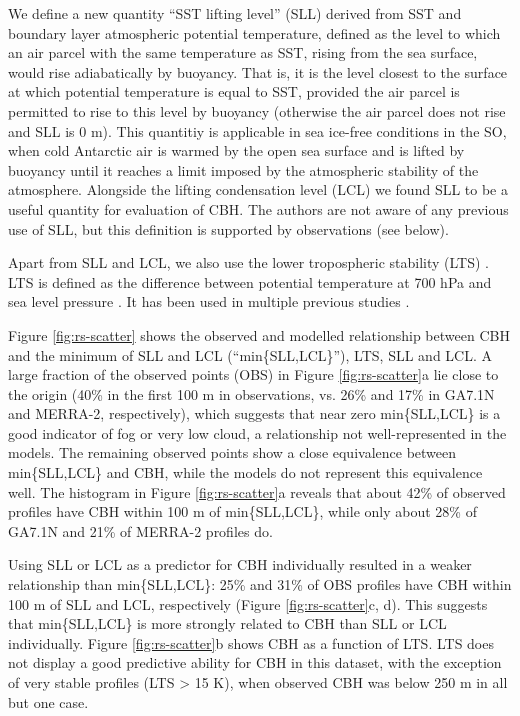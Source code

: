 We define a new quantity ``SST lifting level'' (SLL) derived
from SST and boundary layer atmospheric potential temperature,
defined as the level to which
an air parcel with the same temperature as SST, rising from the sea surface,
would rise adiabatically by buoyancy. That is, it is the level closest to the
surface at which potential temperature is equal to SST, provided the air parcel
is permitted to rise to this level by buoyancy (otherwise the air parcel does
not rise and SLL is 0 m). This quantitiy is applicable in sea ice-free
conditions in the SO, when cold Antarctic air is warmed by the open sea surface
and is lifted by buoyancy until it reaches a limit imposed by the atmospheric
stability of the atmosphere. Alongside the lifting condensation level (LCL) we
found SLL to be a useful quantity for evaluation of CBH. The
authors are not aware of any previous use of SLL, but this definition is
supported by observations (see below).

Apart from SLL and LCL, we also use the lower tropospheric stability (LTS)
\citep{klein1993}. LTS is defined as the difference between potential
temperature at 700 hPa and sea level pressure \citep{klein1993}. It has been
used in multiple previous studies
\citep{williams2006,franklin2013,williams2013,naud2014}. 

Figure \ref{fig:rs-scatter} shows the observed and modelled relationship
between CBH and the minimum of SLL and LCL (``min\{SLL,LCL\}''), LTS, SLL and
LCL. A large fraction of the observed points (OBS) in Figure
\ref{fig:rs-scatter}a lie close to the origin (40\% in the first 100 m in
observations, vs. 26\% and 17\% in GA7.1N and MERRA-2, respectively), which
suggests that near zero min\{SLL,LCL\} is a good indicator of fog or very low
cloud, a relationship not well-represented in the models. The remaining
observed points show a close equivalence between min\{SLL,LCL\} and CBH, while
the models do not represent this equivalence well.  The histogram in Figure
\ref{fig:rs-scatter}a reveals that about 42\% of observed profiles have CBH
within 100 \unit{m} of min\{SLL,LCL\}, while only about 28\% of GA7.1N and 21\%
of MERRA-2 profiles do.

Using SLL or LCL as a predictor for CBH individually resulted in a weaker
relationship than min\{SLL,LCL\}: 25\% and 31\% of OBS profiles have CBH within
100 \unit{m} of SLL and LCL, respectively (Figure \ref{fig:rs-scatter}c, d).
This suggests that min\{SLL,LCL\} is more strongly related to CBH than SLL or LCL
individually. Figure \ref{fig:rs-scatter}b shows CBH as a function of LTS. LTS
does not display a good predictive ability for CBH in this dataset, with the
exception of very stable profiles (LTS > 15 K), when observed CBH was below 250
\unit{m} in all but one case.

